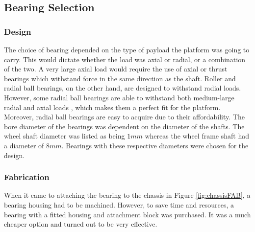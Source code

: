 \subsection{Bearing Selection}
\subsubsection{Design}
The choice of bearing depended on the type of payload the platform was going to carry. This would dictate whether the load was axial or radial, or a combination of the two. A very large axial load would require the use of axial or thrust bearings which withstand force in the same direction as the shaft. Roller and radial ball bearings, on the other hand, are designed to withstand radial loads. However, some radial ball bearings are able to withstand both medium-large radial and axial loads \cite{noauthor_4_nodate}, which makes them a perfect fit for the platform. Moreover, radial ball bearings are easy to acquire due to their affordability. 
The bore diameter of the bearings was dependent on the diameter of the shafts. The wheel shaft diameter was listed as being $1mm$ whereas the wheel frame shaft had a diameter of $8mm$. Bearings with these respective diameters were chosen for the design.

\subsubsection{Fabrication}
When it came to attaching the bearing to the chassis in Figure \ref{fig:chassisFAB}, a bearing housing had to be machined. However, to save time and resources, a bearing with a fitted housing and attachment block was purchased. It was a much cheaper option and turned out to be very effective. 

